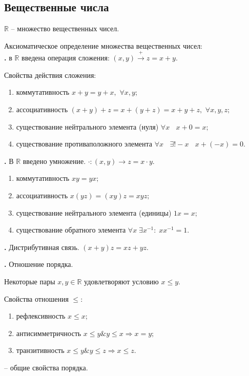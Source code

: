 \subsection{Вещественные  числа}
$\mathbb{R}$ -- множество вещественных чисел.

Аксиоматическое определение множества вещественных чисел:\\

{\bf {}.} в $\mathbb{R}$ введена операция сложения: $(x,y) \xrightarrow{\text{+}} z=x+y.$
\par Свойства действия сложения:
\begin{enumerate}
\item коммутативность \quad  $x+y=y+x,$ $\forall x, y ;$
\item ассоциативность \quad  $(x+y)+z=x+(y+z)=x+y+z,$ $\forall x, y, z ;$
\item существование нейтрального элемента (нуля) \quad $\forall x\;\;$ $x+0=x;$
\item существование противаположного элемента \quad $\forall x\;\;$  $\exists ! -x\;\;$ $x+(-x)=0.$
\end{enumerate}

{\bf {}.} В $\mathbb{R}$ введено умножение. $\cdot:(x,y)\rightarrow z=x\cdot y.$
\begin{enumerate}
\item коммутативность \quad $xy=yx;$
\item ассоциативность \quad $x(yz)=(xy)z=xyz;$
\item существование нейтрального элемента (единицы) \quad $1x=x;$
\item существование обратного элемента \quad $\forall x \; \exists x^{-1}: \; xx^{-1}=1.$
\end{enumerate}

{\bf {}.} Дистрибутивная связь. $(x+y)z=xz+yz.$

{\bf {}.} Отношение порядка. 

Некоторые пары $x,y\in\mathbb{R}$ удовлетворяют условию $x\leq y.$

Свойства отношения $\leq:$
\begin{enumerate}
\item рефлексивность \quad $x\leq x;$
\item антисимметричность \quad $x\leq y \& y\leq x \Rightarrow x=y;$
\item транзитивность \quad $x\leq y \& y\leq z \Rightarrow x\leq z.$
\end{enumerate}
-- общие свойства порядка.\\

